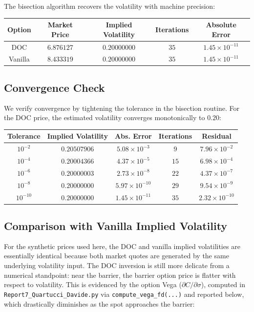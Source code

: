 \documentclass{report}
\begin{document}
The bisection algorithm recovers the volatility with machine precision:

\begin{center}
\begin{tabular}{ccccc}
\toprule
Option & Market Price & Implied Volatility & Iterations & Absolute Error \\
\midrule
DOC & $6.876127$ & $0.20000000$ & $35$ & $1.45\times 10^{-11}$ \\
Vanilla & $8.433319$ & $0.20000000$ & $35$ & $1.45\times 10^{-11}$ \\
\bottomrule
\end{tabular}
\end{center}

\subsection{Convergence Check}

We verify convergence by tightening the tolerance in the bisection routine. For the DOC price, the estimated volatility converges monotonically to $0.20$:

\begin{center}
\begin{tabular}{ccccc}
\toprule
Tolerance & Implied Volatility & Abs. Error & Iterations & Residual \\
\midrule
$10^{-2}$ & $0.20507906$ & $5.08\times 10^{-3}$ & $9$ & $7.96\times 10^{-2}$ \\
$10^{-4}$ & $0.20004366$ & $4.37\times 10^{-5}$ & $15$ & $6.98\times 10^{-4}$ \\
$10^{-6}$ & $0.20000003$ & $2.73\times 10^{-8}$ & $22$ & $4.37\times 10^{-7}$ \\
$10^{-8}$ & $0.20000000$ & $5.97\times 10^{-10}$ & $29$ & $9.54\times 10^{-9}$ \\
$10^{-10}$ & $0.20000000$ & $1.45\times 10^{-11}$ & $35$ & $2.32\times 10^{-10}$ \\
\bottomrule
\end{tabular}
\end{center}

\subsection{Comparison with Vanilla Implied Volatility}

For the synthetic prices used here, the DOC and vanilla implied volatilities are essentially identical because both market quotes are generated by the same underlying volatility input. The DOC inversion is still more delicate from a numerical standpoint: near the barrier, the barrier option price is flatter with respect to volatility. This is evidenced by the option Vega ($\partial C / \partial \sigma$), computed in \texttt{Report7\_Quartucci\_Davide.py} via \texttt{compute\_vega\_fd(...)} and reported below, which drastically diminishes as the spot approaches the barrier:
\end{document}
